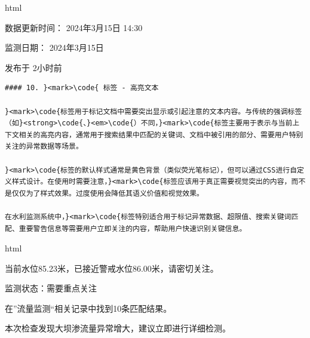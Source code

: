 html

数据更新时间： 2024年3月15日 14:30

监测日期： 2024年3月15日

发布于 2小时前

\begin{lstlisting}
#### 10. }<mark>\code{ 标签 - 高亮文本

}<mark>\code{标签用于标记文档中需要突出显示或引起注意的文本内容。与传统的强调标签（如}<strong>\code{、}<em>\code{）不同，}<mark>\code{标签主要用于表示与当前上下文相关的高亮内容，通常用于搜索结果中匹配的关键词、文档中被引用的部分、需要用户特别关注的异常数据等场景。

}<mark>\code{标签的默认样式通常是黄色背景（类似荧光笔标记），但可以通过CSS进行自定义样式设计。在使用时需要注意，}<mark>\code{标签应该用于真正需要视觉突出的内容，而不是仅仅为了样式效果。过度使用会降低其语义价值和视觉效果。

在水利监测系统中，}<mark>\code{标签特别适合用于标记异常数据、超限值、搜索关键词匹配、重要警告信息等需要用户立即关注的内容，帮助用户快速识别关键信息。

\end{lstlisting}

html

当前水位85.23米，已接近警戒水位86.00米，请密切关注。

监测状态：需要重点关注

在''流量监测``相关记录中找到10条匹配结果。

本次检查发现大坝渗流量异常增大，建议立即进行详细检测。

